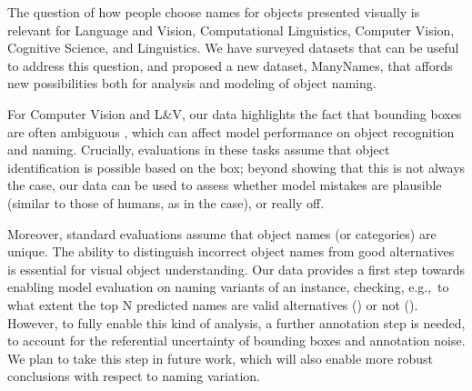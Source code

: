 
The question of how people choose names for objects presented visually is relevant for Language and Vision, Computational Linguistics, Computer Vision, Cognitive Science, and Linguistics.
We have surveyed datasets that can be useful to address this question, and proposed a new dataset, ManyNames, that affords new possibilities both for analysis and modeling of object naming.

For Computer Vision and L\&V, our data highlights the fact that bounding boxes are often ambiguous , which can affect model performance on object recognition and naming.
Crucially, evaluations in these tasks assume that object identification is possible based on the box; beyond showing that this is not always the case, our data can be used to assess whether model mistakes are plausible (similar to those of humans, as in the  case), or really off.

Moreover, standard evaluations assume that object names (or categories) are unique.
The ability to distinguish incorrect object names from good alternatives is essential for visual object understanding.
Our data provides a first step towards enabling model evaluation on naming variants of an instance, checking, e.g.,\ to what extent the top N predicted names are valid alternatives () or not ().
However, to fully enable this kind of analysis, a further annotation step is needed, to account for the referential uncertainty of bounding boxes and annotation noise.
We plan to take this step in future work, which will also enable more robust conclusions with respect to naming variation.

